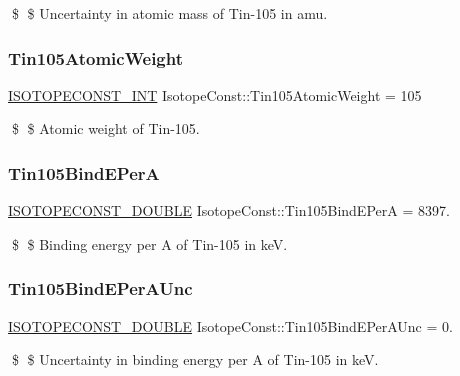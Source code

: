 \$ \$ Uncertainty in atomic mass of Tin-\/105 in amu. \mbox{\label{group___isotope_const-_tin-_sn105_gad4792710956f0849d53c69db53afd316}} 
\subsubsection{\texorpdfstring{Tin105\+Atomic\+Weight}{Tin105AtomicWeight}}
{\footnotesize\ttfamily \mbox{\hyperlink{group___isotope_const-_macros_ga5f18360b3e99483a35c32d789e62621c}{I\+S\+O\+T\+O\+P\+E\+C\+O\+N\+S\+T\+\_\+\+I\+NT}} Isotope\+Const\+::\+Tin105\+Atomic\+Weight = 105}

\$ \$ Atomic weight of Tin-\/105. \mbox{\label{group___isotope_const-_tin-_sn105_gaa3c137facccc3260f038373ed4c800b5}} 
\subsubsection{\texorpdfstring{Tin105\+Bind\+E\+PerA}{Tin105BindEPerA}}
{\footnotesize\ttfamily \mbox{\hyperlink{group___isotope_const-_macros_ga8f45a7272ce02c0b4c65c44636ed719a}{I\+S\+O\+T\+O\+P\+E\+C\+O\+N\+S\+T\+\_\+\+D\+O\+U\+B\+LE}} Isotope\+Const\+::\+Tin105\+Bind\+E\+PerA = 8397.}

\$ \$ Binding energy per A of Tin-\/105 in keV. \mbox{\label{group___isotope_const-_tin-_sn105_ga872a43e36bbad2c2ba6cdd0246eefc4a}} 
\subsubsection{\texorpdfstring{Tin105\+Bind\+E\+Per\+A\+Unc}{Tin105BindEPerAUnc}}
{\footnotesize\ttfamily \mbox{\hyperlink{group___isotope_const-_macros_ga8f45a7272ce02c0b4c65c44636ed719a}{I\+S\+O\+T\+O\+P\+E\+C\+O\+N\+S\+T\+\_\+\+D\+O\+U\+B\+LE}} Isotope\+Const\+::\+Tin105\+Bind\+E\+Per\+A\+Unc = 0.}

\$ \$ Uncertainty in binding energy per A of Tin-\/105 in keV. \mbox{\label{group___isotope_const-_tin-_sn105_ga1abf199487b0a1979d061f7a2d83ab79}} 
